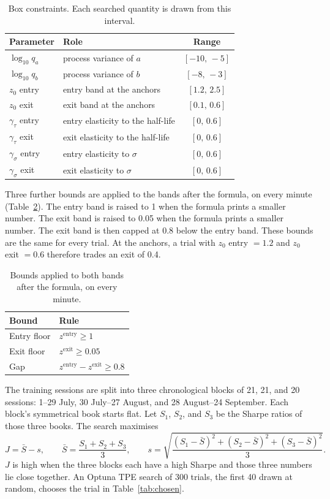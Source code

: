 \documentclass[11pt]{article}
\begin{document}
\begin{table}[ht]
\centering
\caption{Box constraints. Each searched quantity is drawn from this interval.}
\label{tab:search}
\begin{tabular}{llc}
\toprule
Parameter & Role & Range \\
\midrule
$\log_{10} q_a$ & process variance of $a$ & $[-10,\,-5]$ \\
$\log_{10} q_b$ & process variance of $b$ & $[-8,\,-3]$ \\
$z_0$ entry & entry band at the anchors & $[1.2,\,2.5]$ \\
$z_0$ exit & exit band at the anchors & $[0.1,\,0.6]$ \\
$\gamma_\tau$ entry & entry elasticity to the half-life & $[0,\,0.6]$ \\
$\gamma_\tau$ exit & exit elasticity to the half-life & $[0,\,0.6]$ \\
$\gamma_\sigma$ entry & entry elasticity to $\sigma$ & $[0,\,0.6]$ \\
$\gamma_\sigma$ exit & exit elasticity to $\sigma$ & $[0,\,0.6]$ \\
\bottomrule
\end{tabular}
\end{table}

Three further bounds are applied to the bands after the formula, on every minute (Table~\ref{tab:bounds}). The entry band is raised to 1 when the formula prints a smaller number. The exit band is raised to 0.05 when the formula prints a smaller number. The exit band is then capped at 0.8 below the entry band. These bounds are the same for every trial. At the anchors, a trial with $z_0$ entry $= 1.2$ and $z_0$ exit $= 0.6$ therefore trades an exit of 0.4.

\begin{table}[ht]
\centering
\caption{Bounds applied to both bands after the formula, on every minute.}
\label{tab:bounds}
\begin{tabular}{ll}
\toprule
Bound & Rule \\
\midrule
Entry floor & $z^{\mathrm{entry}} \ge 1$ \\
Exit floor & $z^{\mathrm{exit}} \ge 0.05$ \\
Gap & $z^{\mathrm{entry}} - z^{\mathrm{exit}} \ge 0.8$ \\
\bottomrule
\end{tabular}
\end{table}

The training sessions are split into three chronological blocks of 21, 21, and 20 sessions: 1--29 July, 30 July--27 August, and 28 August--24 September. Each block's symmetrical book starts flat. Let $S_1$, $S_2$, and $S_3$ be the Sharpe ratios of those three books. The search maximises
\begin{equation}
J = \bar S - s,
\qquad
\bar S = \frac{S_1 + S_2 + S_3}{3},
\qquad
s = \sqrt{\frac{(S_1 - \bar S)^2 + (S_2 - \bar S)^2 + (S_3 - \bar S)^2}{3}}.
\end{equation}
$J$ is high when the three blocks each have a high Sharpe and those three numbers lie close together. An Optuna TPE search of 300 trials, the first 40 drawn at random, chooses the trial in Table~\ref{tab:chosen}.
\end{document}
